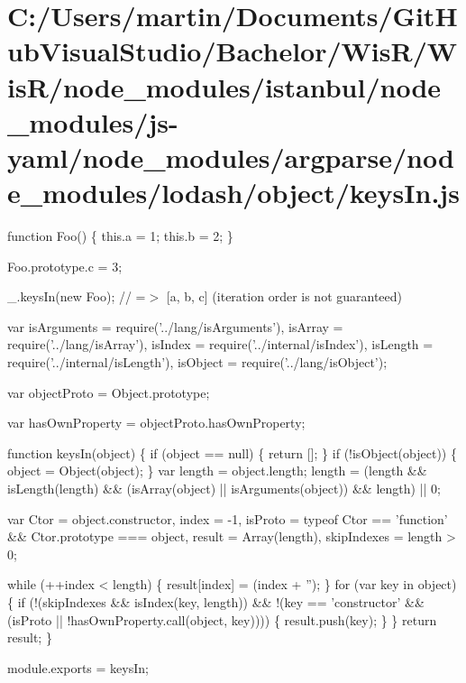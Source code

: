 \hypertarget{_c_1_2_users_2martin_2_documents_2_git_hub_visual_studio_2_bachelor_2_wis_r_2_wis_r_2node_module1ab5f0c2456379d8d072b0cea26790fe}{}\section{C\+:/\+Users/martin/\+Documents/\+Git\+Hub\+Visual\+Studio/\+Bachelor/\+Wis\+R/\+Wis\+R/node\+\_\+modules/istanbul/node\+\_\+modules/js-\/yaml/node\+\_\+modules/argparse/node\+\_\+modules/lodash/object/keys\+In.\+js}
function Foo() \{ this.\+a = 1; this.\+b = 2; \}

Foo.\+prototype.\+c = 3;

\+\_\+.\+keys\+In(new Foo); // =$>$ \mbox{[}\textquotesingle{}a\textquotesingle{}, \textquotesingle{}b\textquotesingle{}, \textquotesingle{}c\textquotesingle{}\mbox{]} (iteration order is not guaranteed)


\begin{DoxyCodeInclude}
var isArguments = require(\textcolor{stringliteral}{'../lang/isArguments'}),
    isArray = require(\textcolor{stringliteral}{'../lang/isArray'}),
    isIndex = require(\textcolor{stringliteral}{'../internal/isIndex'}),
    isLength = require(\textcolor{stringliteral}{'../internal/isLength'}),
    isObject = require(\textcolor{stringliteral}{'../lang/isObject'});

var objectProto = Object.prototype;

var hasOwnProperty = objectProto.hasOwnProperty;

\textcolor{keyword}{function} keysIn(\textcolor{keywordtype}{object}) \{
  \textcolor{keywordflow}{if} (\textcolor{keywordtype}{object} == null) \{
    \textcolor{keywordflow}{return} [];
  \}
  \textcolor{keywordflow}{if} (!isObject(\textcolor{keywordtype}{object})) \{
    \textcolor{keywordtype}{object} = Object(\textcolor{keywordtype}{object});
  \}
  var length = \textcolor{keywordtype}{object}.length;
  length = (length && isLength(length) &&
    (isArray(\textcolor{keywordtype}{object}) || isArguments(\textcolor{keywordtype}{object})) && length) || 0;

  var Ctor = \textcolor{keywordtype}{object}.constructor,
      index = -1,
      isProto = typeof Ctor == \textcolor{stringliteral}{'function'} && Ctor.prototype === object,
      result = Array(length),
      skipIndexes = length > 0;

  \textcolor{keywordflow}{while} (++index < length) \{
    result[index] = (index + \textcolor{stringliteral}{''});
  \}
  \textcolor{keywordflow}{for} (var key in \textcolor{keywordtype}{object}) \{
    \textcolor{keywordflow}{if} (!(skipIndexes && isIndex(key, length)) &&
        !(key == \textcolor{stringliteral}{'constructor'} && (isProto || !hasOwnProperty.call(\textcolor{keywordtype}{object}, key)))) \{
      result.push(key);
    \}
  \}
  \textcolor{keywordflow}{return} result;
\}

module.exports = keysIn;
\end{DoxyCodeInclude}
 